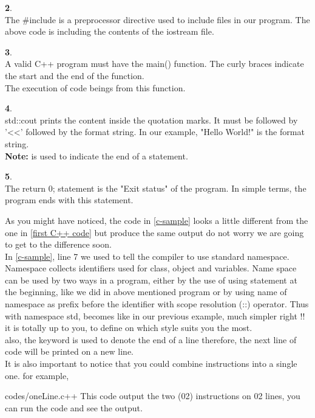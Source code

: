 \documentclass[11pt, a4paper]{article}
\begin{document}
\noindent
\textbf{2}. \\
The \#include is a preprocessor directive used to include files in our
program. The above code is including the contents of the iostream file.

\noindent
\textbf{3}. \\
A valid C++ program must have the main() function. The curly braces
indicate the start and the end of the function. \\ The execution of
code beings from this function.

\noindent
\textbf{4}. \\
std::cout prints the content inside the quotation marks.
It must be followed by '\textless\textless'  followed by the format string.
In our example, "Hello World!" is the format string. \\
\textbf{Note: } \fbox{;} is used to indicate the end of a statement.

\noindent
\textbf{5}. \\
The return 0; statement is the "Exit status" of the program.
In simple terms, the program ends with this statement.

As you might have noticed, the code in \ref{c-sample} looks a little different from the one
in \ref{first C++ code} but produce the same output do not worry we are going to get to the
difference soon. \\
\noindent In \ref{c-sample}, line 7 we used 
to tell the compiler to use standard namespace. Namespace collects identifiers used for class, object
and variables. Name space can be used by two ways in a program, either by the use of using statement
at the beginning, like we did in above mentioned program or by using name of namespace as prefix
before the identifier with scope resolution (::) operator. Thus with namespace std,
becomes 
like in our previous example, much simpler right !! it is totally up to you, to define on which style
suits you the most.\\
\noindent  also, the keyword  is used to denote the end of a line therefore, the next line 
of code will be printed on a new line.\\
It is also important to notice that you could combine instructions into a single one. for example,

{codes/oneLine.c++}
This code output the two (02) instructions on 02 lines, you can run the code and see the output.
\end{document}
